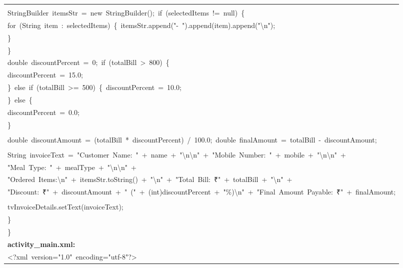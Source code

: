 \documentclass[a4paper,12pt]{article}
\begin{document}
\begin{longtable}{|p{}|}
\strut \\
{\ttfamily\small StringBuilder\ itemsStr\ =\ new\ StringBuilder();\ if\ (selectedItems\ !=\ null)\ \{} \\
{\ttfamily\small for\ (String\ item\ :\ selectedItems)\ \{\ itemsStr.append("-\ ").append(item).append("\textbackslash{}n");} \\
{\ttfamily\small \}} \\
{\ttfamily\small \}} \\
{\ttfamily\small double\ discountPercent\ =\ 0;\ if\ (totalBill\ \textgreater{}\ 800)\ \{} \\
{\ttfamily\small discountPercent\ =\ 15.0;} \\
{\ttfamily\small \}\ else\ if\ (totalBill\ \textgreater{}=\ 500)\ \{\ discountPercent\ =\ 10.0;} \\
{\ttfamily\small \}\ else\ \{} \\
{\ttfamily\small discountPercent\ =\ 0.0;} \\
{\ttfamily\small \}} \\
\strut \\
{\ttfamily\small double\ discountAmount\ =\ (totalBill\ *\ discountPercent)\ /\ 100.0;\ double\ finalAmount\ =\ totalBill\ -\ discountAmount;} \\
\strut \\
{\ttfamily\small String\ invoiceText\ =\ "Customer\ Name:\ "\ +\ name\ +\ "\textbackslash{}n\textbackslash{}n"\ +\ "Mobile\ Number:\ "\ +\ mobile\ +\ "\textbackslash{}n\textbackslash{}n"\ +} \\
{\ttfamily\small "Meal\ Type:\ "\ +\ mealType\ +\ "\textbackslash{}n\textbackslash{}n"\ +} \\
{\ttfamily\small "Ordered\ Items:\textbackslash{}n"\ +\ itemsStr.toString()\ +\ "\textbackslash{}n"\ +\ "Total\ Bill:\ ₹"\ +\ totalBill\ +\ "\textbackslash{}n"\ +} \\
{\ttfamily\small "Discount:\ ₹"\ +\ discountAmount\ +\ "\ ("\ +\ (int)discountPercent\ +\ "\%)\textbackslash{}n"\ +\ "Final\ Amount\ Payable:\ ₹"\ +\ finalAmount;} \\
\strut \\
{\ttfamily\small tvInvoiceDetails.setText(invoiceText);} \\
{\ttfamily\small \}} \\
{\ttfamily\small \}} \\
\hline
\rule{0pt}{13pt}\textbf{activity\_main.xml:} \\
\hline
{\ttfamily\small \textless{}?xml\ version="1.0"\ encoding="utf-8"?\textgreater{}} \\

\end{longtable}
\end{document}
